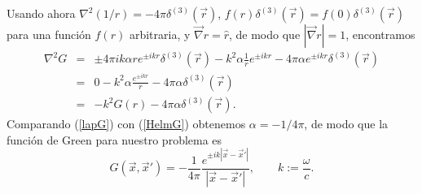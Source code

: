 Usando ahora $\nabla^2\left({1}/{r}\right) =-4\pi\delta^{(3)}(\vec{r})$,
$f(r)\delta^{(3)}(\vec{r})=f(0)\delta^{(3)}(\vec{r})$ para una función $f(r)$ arbitraria, y
$\vec{\nabla}r=\hat{r}$, de modo que $|\vec{\nabla}r|=1$,
encontramos
\begin{eqnarray}
\nabla^2G&=&\pm 4\pi ik\alpha r  e^{\pm ikr}\delta^{(3)}(\vec{r}) -k^2\alpha \frac{1}{r}
e^{\pm ikr}-4\pi\alpha e^{\pm ikr}\delta^{(3)}(\vec{r}) \\
&=&0-k^2\alpha \frac{e^{\pm ikr}}{r}   -4\pi\alpha \delta^{(3)}(\vec{r}) \\
&=&-k^2G(r) -4\pi\alpha \delta^{(3)}(\vec{r}) .\label{lapG}
\end{eqnarray}
Comparando (\ref{lapG}) con (\ref{HelmG}) obtenemos $\alpha=-{1}/{4\pi}$, de
modo que la función de Green para nuestro problema es
\begin{equation}
\boxed{G(\vec{x},\vec{x}')=-\frac{1}{4\pi}\frac{e^{\pm
ik|\vec{x}-\vec{x}'|}}{|\vec{x}-\vec{x}'|}, \qquad k:=\frac{\omega}{c}.} \label{GreenH}
\end{equation}


